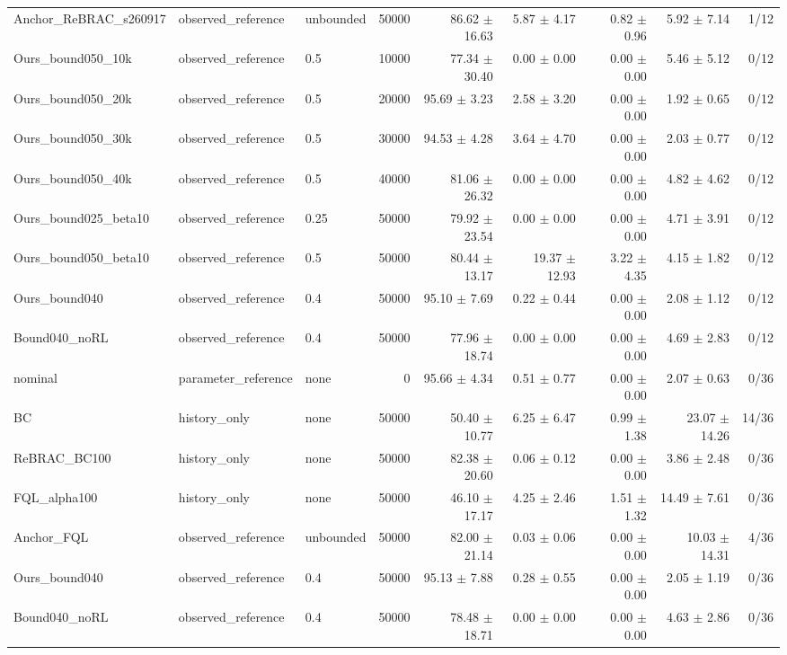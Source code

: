 \begin{tabular}{lllrrrrrr}
Anchor\_ReBRAC\_s260917 & observed\_reference & unbounded & 50000 & 86.62 $\pm$ 16.63 & 5.87 $\pm$ 4.17 & 0.82 $\pm$ 0.96 & 5.92 $\pm$ 7.14 & 1/12 \\
Ours\_bound050\_10k & observed\_reference & 0.5 & 10000 & 77.34 $\pm$ 30.40 & 0.00 $\pm$ 0.00 & 0.00 $\pm$ 0.00 & 5.46 $\pm$ 5.12 & 0/12 \\
Ours\_bound050\_20k & observed\_reference & 0.5 & 20000 & 95.69 $\pm$ 3.23 & 2.58 $\pm$ 3.20 & 0.00 $\pm$ 0.00 & 1.92 $\pm$ 0.65 & 0/12 \\
Ours\_bound050\_30k & observed\_reference & 0.5 & 30000 & 94.53 $\pm$ 4.28 & 3.64 $\pm$ 4.70 & 0.00 $\pm$ 0.00 & 2.03 $\pm$ 0.77 & 0/12 \\
Ours\_bound050\_40k & observed\_reference & 0.5 & 40000 & 81.06 $\pm$ 26.32 & 0.00 $\pm$ 0.00 & 0.00 $\pm$ 0.00 & 4.82 $\pm$ 4.62 & 0/12 \\
Ours\_bound025\_beta10 & observed\_reference & 0.25 & 50000 & 79.92 $\pm$ 23.54 & 0.00 $\pm$ 0.00 & 0.00 $\pm$ 0.00 & 4.71 $\pm$ 3.91 & 0/12 \\
Ours\_bound050\_beta10 & observed\_reference & 0.5 & 50000 & 80.44 $\pm$ 13.17 & 19.37 $\pm$ 12.93 & 3.22 $\pm$ 4.35 & 4.15 $\pm$ 1.82 & 0/12 \\
Ours\_bound040 & observed\_reference & 0.4 & 50000 & 95.10 $\pm$ 7.69 & 0.22 $\pm$ 0.44 & 0.00 $\pm$ 0.00 & 2.08 $\pm$ 1.12 & 0/12 \\
Bound040\_noRL & observed\_reference & 0.4 & 50000 & 77.96 $\pm$ 18.74 & 0.00 $\pm$ 0.00 & 0.00 $\pm$ 0.00 & 4.69 $\pm$ 2.83 & 0/12 \\
nominal & parameter\_reference & none & 0 & 95.66 $\pm$ 4.34 & 0.51 $\pm$ 0.77 & 0.00 $\pm$ 0.00 & 2.07 $\pm$ 0.63 & 0/36 \\
BC & history\_only & none & 50000 & 50.40 $\pm$ 10.77 & 6.25 $\pm$ 6.47 & 0.99 $\pm$ 1.38 & 23.07 $\pm$ 14.26 & 14/36 \\
ReBRAC\_BC100 & history\_only & none & 50000 & 82.38 $\pm$ 20.60 & 0.06 $\pm$ 0.12 & 0.00 $\pm$ 0.00 & 3.86 $\pm$ 2.48 & 0/36 \\
FQL\_alpha100 & history\_only & none & 50000 & 46.10 $\pm$ 17.17 & 4.25 $\pm$ 2.46 & 1.51 $\pm$ 1.32 & 14.49 $\pm$ 7.61 & 0/36 \\
Anchor\_FQL & observed\_reference & unbounded & 50000 & 82.00 $\pm$ 21.14 & 0.03 $\pm$ 0.06 & 0.00 $\pm$ 0.00 & 10.03 $\pm$ 14.31 & 4/36 \\
Ours\_bound040 & observed\_reference & 0.4 & 50000 & 95.13 $\pm$ 7.88 & 0.28 $\pm$ 0.55 & 0.00 $\pm$ 0.00 & 2.05 $\pm$ 1.19 & 0/36 \\
Bound040\_noRL & observed\_reference & 0.4 & 50000 & 78.48 $\pm$ 18.71 & 0.00 $\pm$ 0.00 & 0.00 $\pm$ 0.00 & 4.63 $\pm$ 2.86 & 0/36 \\
\hline
\end{tabular}
